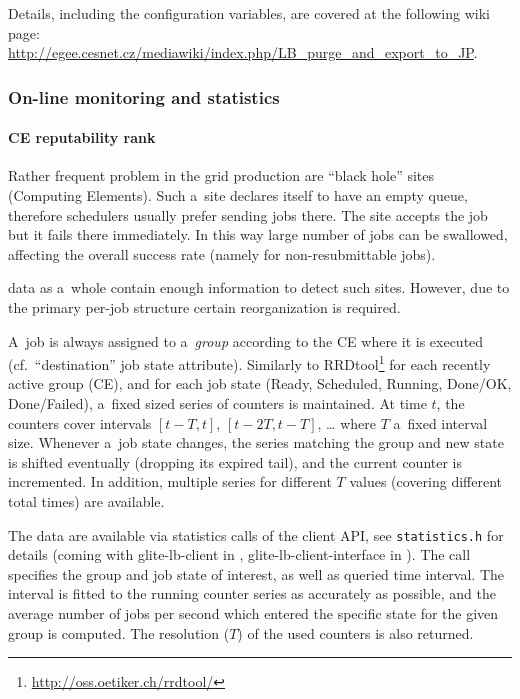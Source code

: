 Details, including the configuration variables, are covered at the following
wiki page:
\url{http://egee.cesnet.cz/mediawiki/index.php/LB_purge_and_export_to_JP}.

\subsubsection{On-line monitoring and statistics}

\paragraph{CE reputability rank}

Rather frequent problem in the grid production are ``black hole'' sites (Computing Elements).
Such a~site declares itself to have an empty queue, therefore schedulers usually prefer sending
jobs there. The site accepts the job but it fails there immediately.
In this way large number of jobs can be swallowed, affecting the overall success rate
(namely for non-resubmittable jobs).

\LB data as a~whole contain enough information to detect such sites.
However, due to the primary per-job structure certain reorganization is required.

A~job is always assigned to a~\emph{group} according to
the CE where it is executed (cf.\ ``destination'' job state attribute).
Similarly to RRDtool\footnote{\url{http://oss.oetiker.ch/rrdtool/}}
for each recently active group (CE),
and for each job state (Ready, Scheduled, Running, Done/OK, Done/Failed),
a~fixed sized series of counters is maintained.
At time $t$, the counters cover intervals $[t-T,t]$, $[t-2T,t-T]$, \dots
where $T$ a~fixed interval size.
Whenever a~job state changes, the series matching the group and new state
is shifted eventually (dropping its expired tail), and the current counter
is incremented.
In addition, multiple series for different $T$ values (\ie covering different
total times) are available. 

The data are available via statistics calls of the client API,
see \verb'statistics.h' for details (coming with glite-lb-client in \LBnew,
glite-lb-client-interface in \LBold).
The call specifies the group and job state of interest, as well as queried
time interval.
The interval is fitted to the running counter series as accurately as possible,
and the average number of jobs per second which entered the specific state for
the given group is computed.  The resolution ($T$) of the used counters is also
returned.

